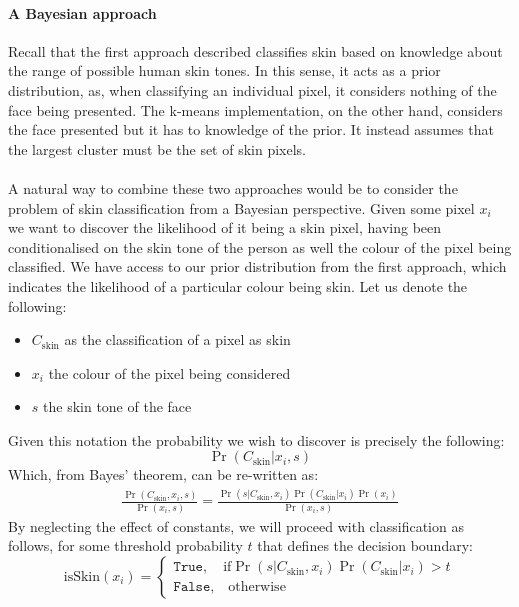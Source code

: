 \paragraph{A Bayesian approach}
Recall that the first approach described classifies skin based on knowledge about the range of possible human skin tones. 
In this sense, it acts as a prior distribution, as, when classifying an individual pixel, it considers nothing of the face being presented.
The k-means implementation, on the other hand, considers the face presented but it has to knowledge of the prior. It instead assumes that the largest cluster must be the set of skin pixels.
\\ \\ 
A natural way to combine these two approaches would be to consider the problem of skin classification from a Bayesian perspective. Given some pixel $x_i$ we want to discover the likelihood of it being a skin pixel, having been conditionalised on the skin tone of the person as well the colour of the pixel being classified. 
We have access to our prior distribution from the first approach, which indicates the likelihood of a particular colour being skin.
Let us denote the following: 
\begin{itemize}
   \item $C_{\mathrm{skin}}$ as the classification of a pixel as skin
   \item $x_i$ the colour of the pixel being considered
   \item $s$ the skin tone of the face
\end{itemize} 
Given this notation the probability we wish to discover is precisely the following:
\begin{equation*}
   \Pr(C_{\mathrm{skin}}| x_i, s) 
\end{equation*}
Which, from Bayes' theorem, can be re-written as: 
\begin{align*}
   \frac{\Pr(C_\mathrm{skin}, x_i, s)}{\Pr(x_i, s)} = \frac{\Pr(s|C_\mathrm{skin}, x_i)\Pr(C_\mathrm{skin}|x_i)\Pr(x_i)}{\Pr(x_i,s)}
\end{align*}
By neglecting the effect of constants, we will proceed with classification as follows, for some threshold probability $t$ that defines the decision boundary: 
\begin{equation*}
    \text{isSkin}(x_i) = 
    \begin{cases}
        \texttt{True}, \quad \text{if} \Pr(s|C_\mathrm{skin}, x_i)\Pr(C_\mathrm{skin}|x_i) > t \\
        \texttt{False}, \quad \text{otherwise}
    \end{cases}
\end{equation*}
